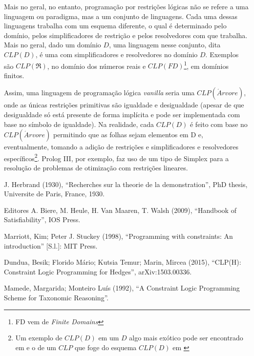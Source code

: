 \documentclass{article}
\theoremstyle{remark}
\theoremstyle{theorem}
\begin{document}
Mais no geral, no entanto, programação por restrições lógicas não se refere a uma linguagem ou paradigma, mas a um conjunto
de linguagens. Cada uma dessas linguagens trabalha com um esquema diferente, o qual é determinado pelo domínio,
pelos simplificadores de restrição e pelos resolvedores com que trabalha. Mais no geral, dado um domínio $D$,
uma linguagem nesse conjunto, dita $CLP(D)$, é uma com simplificadores e resolvedores no domínio $D$.
Exemplos são $CLP(\Re)$, no domínio dos números reais e $CLP(FD)$\footnote{FD vem de \textit{Finite Domains}}, em domínios finitos.

Assim, uma linguagem de programação lógica \textit{vanilla} seria uma $CLP(\acute{A}rvore)$, onde as únicas restrições primitivas são igualdade e desigualdade (apesar de que desigualdade só está presente de forma implícita e pode ser implementada com base no símbolo de igualdade).
Na realidade, cada $CLP(D)$ é feito com base no $CLP(\acute{A}rvore)$ permitindo que as folhas sejam elementos em D e, eventualmente, tomando a adição de restrições e simplificadores e resolvedores específicos\footnote{Um exemplo de $CLP(D)$ em um $D$ algo mais exótico pode ser encontrado em \cite{besik} e o de um $CLP$ que foge do esquema $CLP(D)$ em \cite{margarida}}. Prolog III, por exemplo, faz uso de um tipo de Simplex para a resolução
de problemas de otimização com restrições lineares.



  \begin{thebibliography}{1}

      J. Herbrand (1930), ``Recherches sur la theorie de la demonstration'', PhD thesis, Universite de Paris, France, 1930.

      Editores A. Biere, M. Heule, H. Van Maaren, T. Walsh (2009), ``Handbook of Satisfiability'', IOS Press.

      Marriott, Kim; Peter J. Stuckey (1998), ``Programming with constraints: An introduction'' [S.l.]: MIT Press.

      Dundua, Besik; Florido Mário; Kutsia Temur; Marin, Mircea (2015), ``CLP(H): Constraint Logic Programming for Hedges'',  	arXiv:1503.00336.

      Mamede, Margarida; Monteiro Luís (1992), ``A Constraint Logic Programming Scheme for Taxonomic Reasoning''.

  \end{thebibliography}
\end{document}
